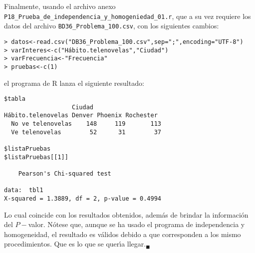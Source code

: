 \begin{solucion}
 Finalmente, usando el archivo anexo
 \texttt{P18\_Prueba\_de\_independencia\_y\_homogeniedad\_01.r},
 que a su vez requiere los datos del archivo
 \texttt{BD36\_Problema\_100.csv}, con los siguientes cambios:
 \begin{verbatim}
> datos<-read.csv("DB36_Problema_100.csv",sep=";",encoding="UTF-8")
> varInteres<-c("Hábito.telenovelas","Ciudad")
> varFrecuencia<-"Frecuencia"
> pruebas<-c(1)
 \end{verbatim}
 \vspace{-0.5cm}
 el programa de R lanza el siguiente resultado:
 \begin{verbatim}
$tabla
                   Ciudad
Hábito.telenovelas Denver Phoenix Rochester
  No ve telenovelas    148     119       113
  Ve telenovelas        52      31        37

$listaPruebas
$listaPruebas[[1]]

	Pearson's Chi-squared test

data:  tbl1
X-squared = 1.3889, df = 2, p-value = 0.4994
 \end{verbatim}
 \vspace{-0.5cm}
 Lo cual coincide con los resultados obtenidos,
 adem\'as de brindar la informaci\'on del $P-$valor.
 N\'otese que, aunque se ha usado el programa de independencia
 y homogeneidad, el resultado es v\'alidos debido a que corresponden
 a los mismo procedimientos.
 Que es lo que se quer\'{\i}a llegar.${}_{\blacksquare}$
\end{solucion}
